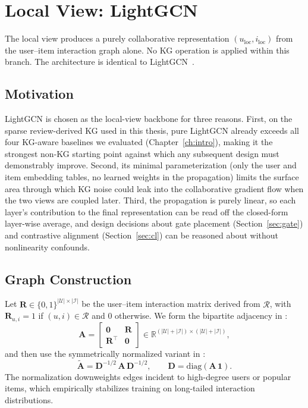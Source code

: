 \section{Local View: LightGCN}
\label{sec:local}

The local view produces a purely collaborative representation $(u_{\mathrm{loc}}, i_{\mathrm{loc}})$ from the user--item interaction graph alone. No KG operation is applied within this branch. The architecture is identical to LightGCN~\cite{he2020lightgcn}.

\subsection{Motivation}
\label{sec:local-motivation}

LightGCN is chosen as the local-view backbone for three reasons. First, on the sparse review-derived KG used in this thesis, pure LightGCN already exceeds all four KG-aware baselines we evaluated (Chapter~\ref{ch:intro}), making it the strongest non-KG starting point against which any subsequent design must demonstrably improve. Second, its minimal parameterization (only the user and item embedding tables, no learned weights in the propagation) limits the surface area through which KG noise could leak into the collaborative gradient flow when the two views are coupled later. Third, the propagation is purely linear, so each layer's contribution to the final representation can be read off the closed-form layer-wise average, and design decisions about gate placement (Section~\ref{sec:gate}) and contrastive alignment (Section~\ref{sec:cl}) can be reasoned about without nonlinearity confounds.

\subsection{Graph Construction}
\label{sec:local-graph}

Let $\mathbf{R} \in \{0,1\}^{|\mathcal{U}| \times |\mathcal{I}|}$ be the user--item interaction matrix derived from $\mathcal{R}$, with $\mathbf{R}_{u,i} = 1$ if $(u,i) \in \mathcal{R}$ and $0$ otherwise. We form the bipartite adjacency in :
\begin{equation}
\label{eq:bipartite-A}
\mathbf{A} = \begin{bmatrix} \mathbf{0} & \mathbf{R} \\ \mathbf{R}^{\top} & \mathbf{0} \end{bmatrix} \in \mathbb{R}^{(|\mathcal{U}| + |\mathcal{I}|) \times (|\mathcal{U}| + |\mathcal{I}|)},
\end{equation}
and then use the symmetrically normalized variant in :
\begin{equation}
\label{eq:normalized-A}
\tilde{\mathbf{A}} = \mathbf{D}^{-1/2}\, \mathbf{A}\, \mathbf{D}^{-1/2}, \qquad \mathbf{D} = \mathrm{diag}\!\left(\mathbf{A}\,\mathbf{1}\right).
\end{equation}
The normalization downweights edges incident to high-degree users or popular items, which empirically stabilizes training on long-tailed interaction distributions.

